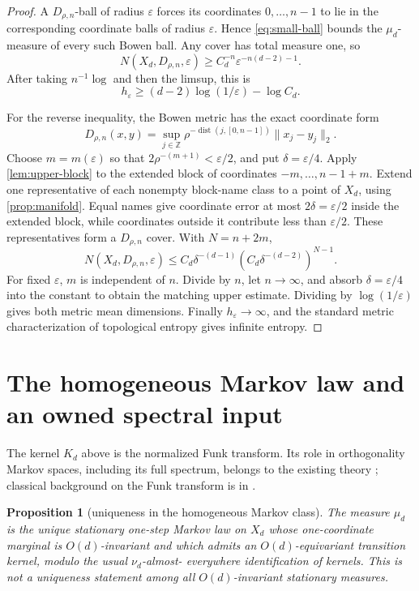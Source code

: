 \documentclass[11pt,a4paper]{amsart}
\newtheorem{proposition}[theorem]{Proposition}
\theoremstyle{definition}
\theoremstyle{remark}
\newcommand{\Z}{\mathbb Z}
\newcommand{\dist}{\operatorname{dist}}
\begin{document}
\begin{proof}
A $D_{\rho,n}$-ball of radius $\varepsilon$ forces its coordinates
$0,\ldots,n-1$ to lie in the corresponding coordinate balls of radius
$\varepsilon$.  Hence \eqref{eq:small-ball} bounds the $\mu_d$-measure of
every such Bowen ball.  Any cover has total measure one, so
\[
 N(X_d,D_{\rho,n},\varepsilon)
 \geq C_d^{-n}\varepsilon^{-n(d-2)-1}.
\]
After taking $n^{-1}\log$ and then the limsup, this is
\[
 h_\varepsilon\geq(d-2)\log(1/\varepsilon)-\log C_d.
\]

For the reverse inequality, the Bowen metric has the exact coordinate form
\[
 D_{\rho,n}(x,y)
 =\sup_{j\in\Z}\rho^{-\dist(j,[0,n-1])}\|x_j-y_j\|_2.
\]
Choose $m=m(\varepsilon)$ so that $2\rho^{-(m+1)}<\varepsilon/2$, and put
$\delta=\varepsilon/4$.  Apply \cref{lem:upper-block} to the extended block
of coordinates $-m,\ldots,n-1+m$.  Extend one representative of each
nonempty block-name class to a point of $X_d$, using
\cref{prop:manifold}.  Equal names give coordinate error at most
$2\delta=\varepsilon/2$ inside the extended block, while coordinates outside
it contribute less than $\varepsilon/2$.  These representatives form a
$D_{\rho,n}$ cover.  With $N=n+2m$,
\[
 N(X_d,D_{\rho,n},\varepsilon)
 \leq C_d\delta^{-(d-1)}
       (C_d\delta^{-(d-2)})^{N-1}.
\]
For fixed $\varepsilon$, $m$ is independent of $n$.  Divide by $n$, let
$n\to\infty$, and absorb $\delta=\varepsilon/4$ into the constant to obtain
the matching upper estimate.  Dividing by $\log(1/\varepsilon)$ gives both
metric mean dimensions.  Finally $h_\varepsilon\to\infty$, and the standard
metric characterization of topological entropy gives infinite entropy.
\end{proof}

\section{The homogeneous Markov law and an owned spectral input}

The kernel $K_d$ above is the normalized Funk transform.  Its role in
orthogonality Markov spaces, including its full spectrum, belongs to the
existing theory \cite{KunszentiEtAl2024}; classical background on the Funk
transform is in \citet{Helgason1999}.

\begin{proposition}[uniqueness in the homogeneous Markov class]\label{prop:unique}
The measure $\mu_d$ is the unique stationary one-step Markov law on $X_d$
whose one-coordinate marginal is $O(d)$-invariant and which admits an
$O(d)$-equivariant transition kernel, modulo the usual $\nu_d$-almost-
everywhere identification of kernels.  This is not a uniqueness statement
among all $O(d)$-invariant stationary measures.
\end{proposition}
\end{document}
